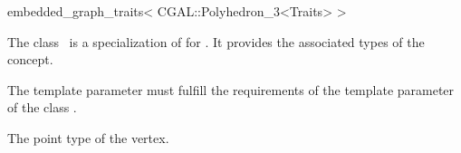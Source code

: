 

\begin{ccRefClass}{embedded_graph_traits< CGAL::Polyhedron_3<Traits> >}


\ccDefinition

The class \ccRefName\ is a specialization of 
for . It provides the associated types 
of the  concept.

The template parameter  must fulfill the requirements of the template parameter 
 of the class .



\ccTypes
  {The point type of the vertex.}

\ccSeeAlso

\end{ccRefClass}


